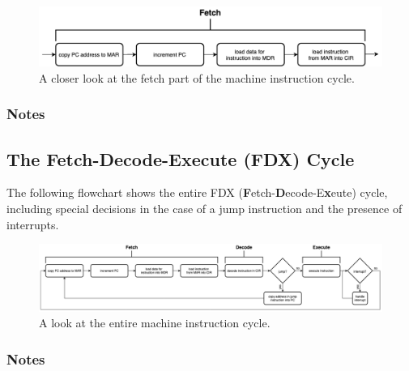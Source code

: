    \begin{figure}[h]
        \centering
        \includegraphics[width=0.9\boxwidth]{Extras/cycle_fetch}
        \caption{A closer look at the fetch part of the machine instruction cycle.}
    \end{figure}

    \subsubsection*{Notes}

    \vfill


    \pagebreak
    
    \subsection*{The Fetch-Decode-Execute (FDX) Cycle}
    The following flowchart shows the entire FDX (\textbf{F}etch-\textbf{D}ecode-E\textbf{x}eute) cycle, including special decisions in the case of a jump instruction and the presence of interrupts.

    \begin{figure}[h]
        \centering
        \includegraphics[width=0.9\boxwidth]{Extras/cycle_fdx}
        \caption{A look at the entire machine instruction cycle.}
    \end{figure}

    \subsubsection*{Notes}

    \vfill


